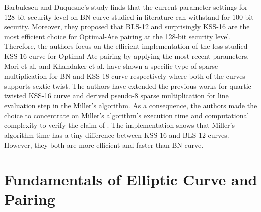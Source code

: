 Barbulescu and Duquesne's study finds that the current parameter settings for 128-bit security level on BN-curve studied in literature can withstand for 100-bit security. 
Moreover, they proposed that BLS-12 and surprisingly KSS-16 are the most efficient choice for Optimal-Ate pairing at the 128-bit security level. Therefore, the authors focus on the efficient implementation of the less studied KSS-16 curve for Optimal-Ate pairing by applying the most recent parameters.
Mori et al. \cite{PAIRING:MANS13} and Khandaker et al. \cite{ICISC:KONSD16} have shown a specific type of sparse multiplication for BN and KSS-18 curve respectively where both of the curves supports sextic twist. 
The authors have extended the previous works for quartic twisted KSS-16 curve and derived pseudo-8 sparse multiplication for line evaluation step in the Miller's algorithm. 
As a consequence, the authors made the choice to concentrate on Miller's algorithm's execution time and computational complexity to verify the claim of \cite{sylvain_new_param}.
The implementation shows that Miller's algorithm time has a tiny difference between KSS-16 and BLS-12 curves. However, they both are more efficient and faster than BN curve. 



\section{Fundamentals of Elliptic Curve and Pairing}
